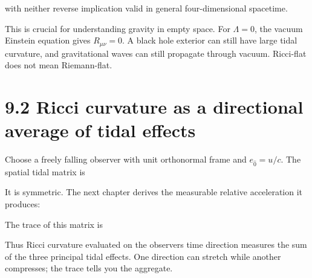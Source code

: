 \documentclass[
  11pt,
  letterpaper,
  oneside,
  openany]{scrbook}
\begin{document}
with neither reverse implication valid in general four-dimensional
spacetime.

This is crucial for understanding gravity in empty space. For
\(\Lambda=0\), the vacuum Einstein equation gives \(R_{\mu\nu}=0\). A
black hole exterior can still have large tidal curvature, and
gravitational waves can still propagate through vacuum. Ricci-flat does
not mean Riemann-flat.

\hypertarget{ricci-curvature-as-a-directional-average-of-tidal-effects}{%
\section{9.2 Ricci curvature as a directional average of tidal
effects}\label{ricci-curvature-as-a-directional-average-of-tidal-effects}}

Choose a freely falling observer with unit orthonormal frame and
\(e_{\hat0}=u/c\). The spatial tidal matrix is

\begin{center}
\begingroup
{}
\ifdim\wd\grmathbox>\linewidth
\resizebox{\linewidth}{!}{\usebox{\grmathbox}}
\else\usebox{\grmathbox}\fi
\endgroup
\end{center}

It is symmetric. The next chapter derives the measurable relative
acceleration it produces:

\begin{center}
\begingroup
{}
\ifdim\wd\grmathbox>\linewidth
\resizebox{\linewidth}{!}{\usebox{\grmathbox}}
\else\usebox{\grmathbox}\fi
\endgroup
\end{center}

The trace of this matrix is

\begin{center}
\begingroup
{}
\ifdim\wd\grmathbox>\linewidth
\resizebox{\linewidth}{!}{\usebox{\grmathbox}}
\else\usebox{\grmathbox}\fi
\endgroup
\end{center}

Thus Ricci curvature evaluated on the observer\textquotesingle s time
direction measures the sum of the three principal tidal effects. One
direction can stretch while another compresses; the trace tells you the
aggregate.
\end{document}
